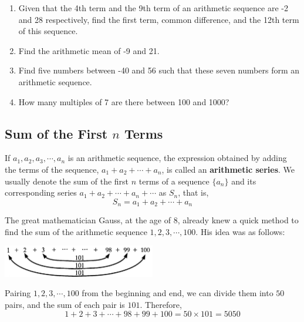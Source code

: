 \documentclass{report}
\begin{document}
\begin{enumerate}
    \item Given that the 4th term and the 9th term of an arithmetic sequence are -2 and 28 respectively, find the first term, common difference, and the 12th term of this sequence.
    \item Find the arithmetic mean of -9 and 21.
    \item Find five numbers between -40 and 56 such that these seven numbers form an arithmetic sequence.
    \item How many multiples of 7 are there between 100 and 1000?
\end{enumerate}

\subsection*{Sum of the First \(n\) Terms}

If \(a_{1}, a_{2}, a_{3}, \cdots, a_{n}\) is an arithmetic sequence, the expression obtained by adding the terms of the sequence, \(a_{1}+a_{2}+\cdots+a_{n}\), is called an \textbf{arithmetic series}. We usually denote the sum of the first \(n\) terms of a sequence \(\{a_{n}\}\) and its corresponding series \(a_{1}+a_{2}+\cdots+a_{n}+\cdots\) as \(S_{n}\), that is,
$$
S_{n}=a_{1}+a_{2}+\cdots+a_{n}
$$

\vspace{-1em}
The great mathematician Gauss, at the age of $8$, already knew a quick method to find the sum of the arithmetic sequence \(1, 2, 3, \cdots, 100\). His idea was as follows:
\begin{center}
    \includegraphics[width=0.5\textwidth]{assets/13-2.jpg}
\end{center}

Pairing \(1, 2, 3, \cdots, 100\) from the beginning and end, we can divide them into $50$ pairs, and the sum of each pair is $101$. Therefore,
$$
1+2+3+\cdots+98+99+100=50 \times 101=5050
$$
\end{document}
